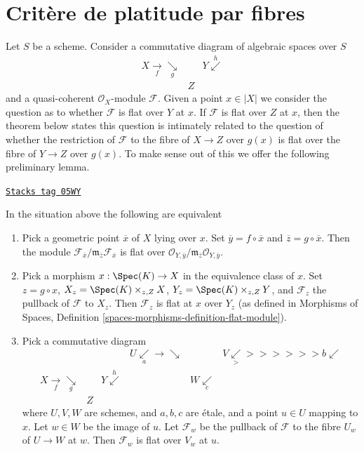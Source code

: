 \section{Crit\`ere de platitude par fibres}
\label{spaces-more-morphisms-section-criterion-flat-fibres}
Let $S$ be a scheme. Consider a commutative diagram of algebraic spaces
over $S$
$$
\begin{array}{ccc}X \underset{f}{\longrightarrow}\underset{g}{\searrow} &  & Y \overset{h}{\swarrow} \\  & Z & \end{array}
$$
and a quasi-coherent $\mathcal{O}_X$-module $\mathcal{F}$.
Given a point $x \in |X|$ we consider the question as to whether
$\mathcal{F}$ is flat over $Y$ at $x$. If $\mathcal{F}$ is flat
over $Z$ at $x$, then the theorem below states this question is
intimately related to the question of whether the restriction of
$\mathcal{F}$ to the fibre of $X \to Z$ over $g(x)$
is flat over the fibre of $Y \to Z$ over $g(x)$. To make sense
out of this we offer the following preliminary lemma.

\begin{lemma}
\label{spaces-more-morphisms-lemma-flat-on-fibres-at-point}
\href{https://stacks.math.columbia.edu/tag/05WY}{\texttt{Stacks tag 05WY}}

In the situation above the following are equivalent
\begin{enumerate}
\item Pick a geometric point $\overline{x}$ of $X$ lying over $x$.
Set $\overline{y} = f \circ \overline{x}$ and
$\overline{z} = g \circ \overline{x}$. Then the module
$\mathcal{F}_{\overline{x}}/
\mathfrak m_{\overline{z}}\mathcal{F}_{\overline{x}}$
is flat over
$\mathcal{O}_{Y, \overline{y}}/
\mathfrak m_{\overline{z}}\mathcal{O}_{Y, \overline{y}}$.
\item Pick a morphism $x : \Spec(K) \to X$ in the equivalence class of
$x$. Set $z = g \circ x$, $X_z = \Spec(K) \times_{z, Z} X$,
$Y_z = \Spec(K) \times_{z, Z} Y$, and $\mathcal{F}_z$ the pullback
of $\mathcal{F}$ to $X_z$. Then $\mathcal{F}_z$ is flat at $x$ over
$Y_z$ (as defined in Morphisms of Spaces,
Definition \ref{spaces-morphisms-definition-flat-module}).
\item Pick a commutative diagram
$$
\begin{array}{cccccc} &  &  & U \underset{a}{\swarrow}\longrightarrow\searrow &  & V \underset{>}{\swarrow}>>>>>>b \swarrow \\ X \underset{f}{\longrightarrow}\underset{g}{\searrow} &  & Y \overset{h}{\swarrow} &  & W \underset{c}{\swarrow} &  \\  & Z &  &  &  & \end{array}
$$
where $U, V, W$ are schemes, and $a, b, c$ are \'etale,
and a point $u \in U$ mapping to $x$. Let $w \in W$ be the image of
$u$. Let $\mathcal{F}_w$ be the pullback of $\mathcal{F}$ to
the fibre $U_w$ of $U \to W$ at $w$. Then $\mathcal{F}_w$
is flat over $V_w$ at $u$.
\end{enumerate}
\end{lemma}

